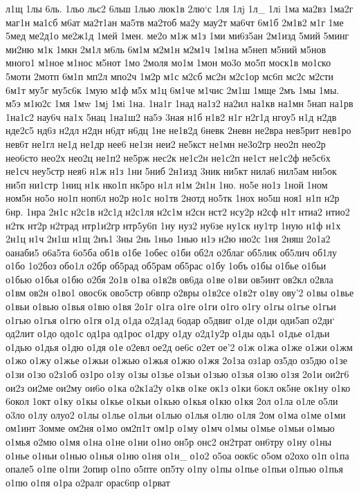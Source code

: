 {{л1щ
1лы
6ль.
1льо
льс2
6льш
1лью
люк1в
2лю`с
1ля
1лj
1л_
1лi
1ма
ма2вз
1ма2г
маг1н
ма1сб
м6ат
ма2т1ан
ма5тв
ма2тоб
ма2у
мау2т
ма6чт
6м1б
2м1в2
м1г
1ме
5мед
ме2д1о
ме2ж1д
1мей
1мен.
ме2о
м1ж
м1з
1ми
ми6з5ан
2м1изд
5мий
5минг
ми2ню
м1к
1мкн
2м1л
м6ль
6м1м
м2м1н
м2м1ч
1м1на
м5неп
м5ний
м5нов
много1
м1ное
м1нос
м5нот
1мо
2моля
мо1м
1мон
мо3о
мо5п
моск1в
мо1ско
5моти
2мотп
6м1п
мп2л
мпо2ч
1м2р
м1с
м2сб
мс2н
м2с1ор
мс6п
мс2с
м2сти
6м1т
му5г
му5с6к
1мую
м1ф
м5х
м1ц
6м1че
м1чис
2м1ш
1мще
2мъ
1мы
1мы.
м5э
м1ю2с
1мя
1мw
1мj
1мi
1на.
1на1г
1над
на1з2
на2ил
на1кв
на1мн
5нап
на1рв
1на1с2
нау6ч
на1х
5нац
1на1ш2
на5э
3ная
н1б
н1в2
н1г
н2г1д
нгоу5
н1д
н2дв
нде2с5
нд6з
н2дл
н2дн
н6дт
н6дц
1не
не1в2д
6невк
2невн
не2вра
нев5рит
нев1ро
нев6т
не1гл
не1д
не1др
нее6
не1зн
неи2
не5кст
не1мн
не3о2гр
нео2п
нео2р
нео6сто
нео2х
нео2ц
не1п2
не5рж
нес2к
не1с2н
не1с2п
не1ст
не1с2ф
не5с6х
не1сч
неу5стр
нея6
н1ж
н1з
1ни
5ниб
2н1изд
3ник
ни5кт
нила6
нил5ам
ни5ок
ни5п
ни1стр
1ниц
н1к
нко1п
нк5ро
н1л
н1м
2н1н
1но.
но5е
но1з
1ной
1ном
ном5н
но5о
но1п
ноп6л
но2р
но1с
но1тв
2нотд
но5тк
1нох
но5ш
ноя1
н1п
н2р
6нр.
1нра
2н1с
н2с1в
н2с1д
н2с1ля
н2с1м
н2сн
нст2
нсу2р
н2сф
н1т
нтиа2
нтио2
н2тк
нт2р
н2трад
нтр1и2гр
нтр5у6п
1ну
нуз2
ну6зе
ну1ск
ну1тр
1ную
н1ф
н1х
2н1ц
н1ч
2н1ш
н1щ
2нъ1
3ны
2нь
1ньо
1нью
н1э
н2ю
ню2с
1ня
2няш
2о1а2
оанаби5
о6а5та
6о5ба
об1в
о1бе
1обес
о1би
об2л
о2благ
об5лик
об5лич
об1лу
о1бо
1о2боз
обо1л
о2бр
об5рад
об5рам
об5рас
о1бу
1объ
о1бы
о1бье
о1бьи
о1бью
о1бья
о1бю
о2бя
2о1в
о1ва
о1в2в
ов6да
о1ве
о1ви
ов5инт
ов2кл
о2вла
о1вм
ов2н
о1во1
овос6к
ово5стр
о6впр
о2вры
о1в2се
о1в2т
о1ву
ову'2
о1вы
о1вье
о1вьи
о1вью
о1вья
о1вю
о1вя
2о1г
о1га
о1ге
о1ги
о1го
о1гу
о1гы
о1гье
о1гьи
о1гью
о1гья
о1гю
о1гя
о1д
о1да
о2д1ад
6одар
о5двиг
о1де
о1ди
оди5ап
о2ди`
од2лит
о1до
одо1с
од1ра
од1рос
о1дру
о1ду
о2д1у2р
о1ды
одь1
о1дье
о1дьи
о1дью
о1дья
о1дю
о1дя
о1е
о2евл
ое2д
ое6с
о2ет
ое'2
о1ж
о1жа
о1же
о1жи
о1жм
о1жо
о1жу
о1жье
о1жьи
о1жью
о1жья
о1жю
о1жя
2о1за
оз1ар
оз5до
оз5дю
о1зе
о1зи
о1зо
о2з1об
оз1ро
о1зу
о1зы
о1зье
о1зьи
о1зью
о1зья
о1зю
о1зя
2о1и
ои2г6
ои2з
ои2ме
ои2му
ои6о
о1ка
о2к1а2у
о1кв
о1ке
ок1з
о1ки
6окл
ок5не
ок1ну
о1ко
6окол
1окт
о1ку
о1кы
о1кье
о1кьи
о1кью
о1кья
о1кю
о1кя
2ол
о1ла
о1ле
о5ли
о3ло
о1лу
олуо2
о1лы
о1лье
о1льи
о1лью
о1лья
о1лю
о1ля
2ом
о1ма
о1ме
о1ми
ом1инт
3омме
ом2ня
о1мо
ом2п1т
ом1р
о1му
о1мч
о1мы
о1мье
о1мьи
о1мью
о1мья
о2мю
о1мя
о1на
о1не
о1ни
о1но
он5р
онс2
он2трат
он6тру
о1ну
о1ны
о1нье
о1ньи
о1нью
о1нья
о1ню
о1ня
о1н_
о1о2
о5оа
оок6с
о5ом
о2охо
о1п
о1па
опале5
о1пе
о1пи
2опир
о1по
о5пте
оп5ту
о1пу
о1пы
о1пье
о1пьи
о1пью
о1пья
о1пю
о1пя
о1ра
о2ралг
орас6пр
о1рват
}}
